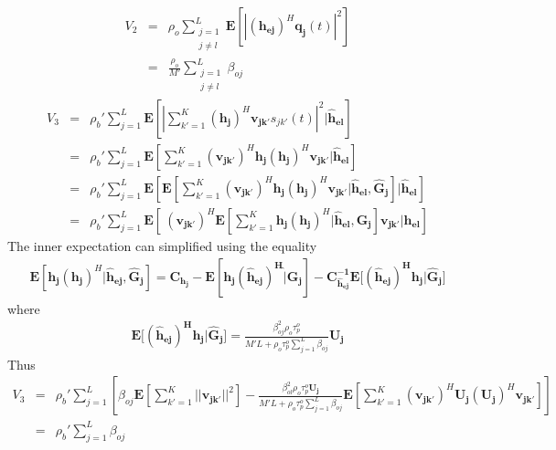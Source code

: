 \documentclass[10pt, a4paper, twoside,fleqn]{article}
\begin{document}
\begin{eqnarray}\label{eqn:otv2}
	V_2 &=& \rho_o \sum_{\substack{j=1 \\ j \neq l}}^{L} \mathbf{E}[|(\mathbf{h_{ej}})^H\mathbf{q_j}(t)|^2] \nonumber \\
            &=& \frac{\rho_o}{M'} \sum_{\substack{j=1 \\ j\neq l}}^{L} \beta_{oj}
\end{eqnarray}
\begin{eqnarray}
	V_3 &=& \rho_b' \sum_{j=1}^{L} \mathbf{E}\left[\left|\sum_{k'=1}^{K} (\mathbf{h_j})^H \mathbf{v_{jk'}}s_{jk'}(t) \right|^2 | \mathbf{\hat h_{el}} \right] \nonumber \\
            &=& \rho_b' \sum_{j=1}^{L} \mathbf{E}\left[\sum_{k'=1}^{K} (\mathbf{v_{jk'}})^H \mathbf{h_j}  (\mathbf{h_j})^H \mathbf{v_{jk'}}| \mathbf{\hat h_{el}} \right] \nonumber \\
            &=& \rho_b' \sum_{j=1}^{L} \mathbf{E}\left[\mathbf{E}\left[\sum_{k'=1}^{K} (\mathbf{v_{jk'}})^H \mathbf{h_j}  (\mathbf{h_j})^H \mathbf{v_{jk'}}| \mathbf{\hat h_{el}},  \mathbf{\hat G_{j}} \right] | \mathbf{\hat h_{el}}\right] \nonumber \\
            &=& \rho_b' \sum_{j=1}^{L} \mathbf{E}\left[\ (\mathbf{v_{jk'}})^H \mathbf{E}\left[\sum_{k'=1}^{K} \mathbf{h_j}  (\mathbf{h_j})^H | \mathbf{\hat h_{el}},  \mathbf{\hat G_{j}} \right] \mathbf{v_{jk'}}| \mathbf{\hat h_{el}}\right]
\end{eqnarray}
The inner expectation can simplified using the equality \cite{bib:rmtBook}
\begin{eqnarray}
	\mathbf{E}[\mathbf{h_j}(\mathbf{h_j})^H|\mathbf{\hat h_{ej}}, \mathbf{\hat G_{j}}] = \mathbf{C_{h_j}}-\mathbf{E[h_j (\hat h_{ej})^H \hat| G_{j}] - C_{\hat h_{ej}}^{-1}E[(\hat h_{ej})^H h_j| \hat G_{j}}]
\end{eqnarray}
where
\begin{eqnarray}
	\mathbf{E[(\hat h_{ej})^H h_j| \hat G_{j}}] = \frac{\beta_{oj}^{2}\rho_o\tau_p^o}{M'L+\rho_o\tau_p^o\sum\limits_{j=1}^{L}\beta_{oj}}\mathbf{U_j}
\end{eqnarray}
Thus
\begin{eqnarray}\label{eqn:otv3}
	V_3 &=& \rho_b' \sum_{j=1}^{L} \left[ \beta_{oj} \mathbf{E}[\sum_{k'=1}^{K}||\mathbf{v_{jk'}}||^2]
					- \frac{\beta_{ol}^{2}\rho_o\tau_p^o\mathbf{U_j}}{M'L+\rho_o\tau_p^o\sum\limits_{j=1}^{L}\beta_{oj}} \mathbf{E}\left[\sum_{k'=1}^{K} (\mathbf{v_{jk'}})^H \mathbf{U_j}  (\mathbf{U_j})^H \mathbf{v_{jk'}}\right]\right] \nonumber \\
	    &=& \rho_b'\sum_{j=1}^{L}\beta_{oj}
\end{eqnarray}
\end{document}
